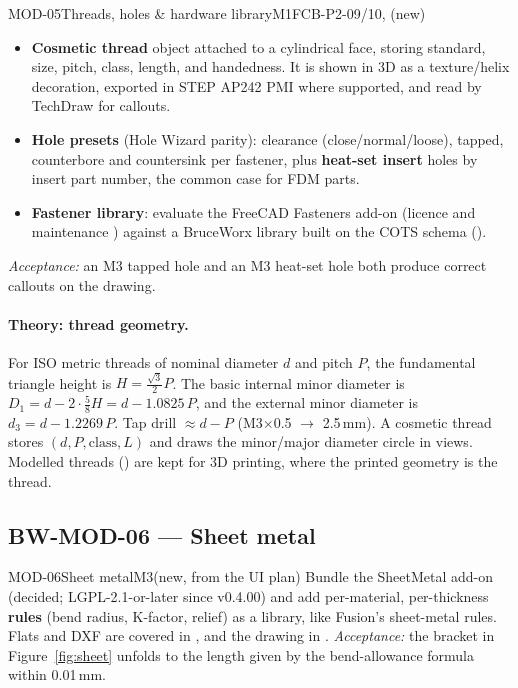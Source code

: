 \begin{epic}{MOD-05}{Threads, holes \& hardware library}{M1}{\stTodo}{FCB-P2-09/10, (new)}
\begin{itemize}
  \item \textbf{Cosmetic thread} object attached to a cylindrical face, storing standard, size, pitch,
        class, length, and handedness. It is shown in 3D as a texture/helix decoration, exported in STEP
        AP242 PMI where supported, and read by TechDraw for callouts.
  \item \textbf{Hole presets} (Hole Wizard parity): clearance (close/normal/loose), tapped, counterbore
        and countersink per fastener, plus \textbf{heat-set insert} holes by insert part number, the common
        case for FDM parts.
  \item \textbf{Fastener library}: evaluate the FreeCAD Fasteners add-on (licence and maintenance
        \verify) against a BruceWorx library built on the COTS schema ().
\end{itemize}
\emph{Acceptance:} an M3 tapped hole and an M3 heat-set hole both produce correct callouts on the drawing.
\end{epic}

\paragraph{Theory: thread geometry.} For ISO metric threads of nominal diameter $d$ and pitch $P$, the
fundamental triangle height is $H=\tfrac{\sqrt3}{2}P$. The basic internal minor diameter is
$D_1=d-2\cdot\tfrac{5}{8}H = d-1.0825\,P$, and the external minor diameter is $d_3=d-1.2269\,P$. Tap drill
$\approx d-P$ (M3$\times$0.5 $\rightarrow$ 2.5\,mm). A cosmetic thread stores $(d,P,\text{class},L)$ and draws
the minor/major diameter circle in views. Modelled threads () are kept for 3D printing,
where the printed geometry is the thread.

\subsection{BW-MOD-06 --- Sheet metal}

\begin{epic}{MOD-06}{Sheet metal}{M3}{\stTodo}{(new, from the UI plan)}
Bundle the SheetMetal add-on (decided; LGPL-2.1-or-later since v0.4.00) and add per-material, per-thickness
\textbf{rules} (bend radius, K-factor, relief) as a library, like Fusion's sheet-metal rules. Flats and
DXF are covered in , and the drawing in .
\emph{Acceptance:} the bracket in Figure~\ref{fig:sheet} unfolds to the length given by the bend-allowance
formula within 0.01\,mm.
\end{epic}


